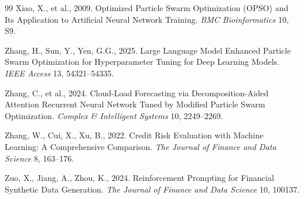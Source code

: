 \begin{thebibliography}{99}
Xiao, X., et al., 2009. Optimized Particle Swarm Optimization (OPSO) and Its Application to Artificial Neural Network Training. \textit{BMC Bioinformatics} 10, S9.

Zhang, H., Sun, Y., Yen, G.G., 2025. Large Language Model Enhanced Particle Swarm Optimization for Hyperparameter Tuning for Deep Learning Models. \textit{IEEE Access} 13, 54321–54335.

Zhang, C., et al., 2024. Cloud-Load Forecasting via Decomposition-Aided Attention Recurrent Neural Network Tuned by Modified Particle Swarm Optimization. \textit{Complex \& Intelligent Systems} 10, 2249–2269.

Zhang, W., Cui, X., Xu, B., 2022. Credit Risk Evaluation with Machine Learning: A Comprehensive Comparison. \textit{The Journal of Finance and Data Science} 8, 163–176.

Zuo, X., Jiang, A., Zhou, K., 2024. Reinforcement Prompting for Financial Synthetic Data Generation. \textit{The Journal of Finance and Data Science} 10, 100137.

\end{thebibliography}
